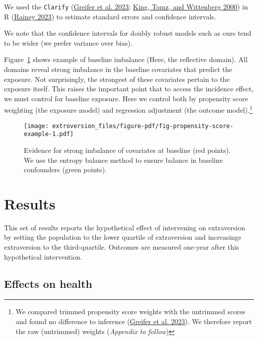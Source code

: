 \documentclass[
  singlecolumn]{report}
\begin{document}
We used the \texttt{Clarify}
(\protect\hyperlink{ref-greifer2023}{Greifer et al. 2023};
\protect\hyperlink{ref-king2000}{King, Tomz, and Wittenberg 2000}) in R
(\protect\hyperlink{ref-rainey2023}{Rainey 2023}) to estimate standard
errors and confidence intervals.

We note that the confidence intervals for doubly robust models such as
ours tend to be wider (we prefer variance over bias).

Figure~\ref{fig-propensity-score-example} shows example of baseline
imbalance (Here, the reflective domain). All domains reveal strong
imbalance in the baseline covariates that predict the exposure. Not
surprisingly, the strongest of these covariates pertain to the exposure
itself. This raises the important point that to access the incidence
effect, we must control for baseline exposure. Here we control both by
propensity score weighting (the exposure model) and regression
adjustment (the outcome model).\footnote{We compared trimmed propensity
  score weights with the untrimmed scores and found no difference to
  inference (\protect\hyperlink{ref-greifer2023}{Greifer et al. 2023}).
  We therefore report the raw (untrimmed) weights (\emph{Appendix to
  follow})}

\begin{figure}

{\centering \texttt{[image: extroversion\_files/figure-pdf/fig-propensity-score-example-1.pdf]}

}

\caption{\label{fig-propensity-score-example}Evidence for strong
imbalance of covariates at baseline (red points). We use the entropy
balance method to ensure balance in baseline confounders (green
points).}

\end{figure}

\hypertarget{results}{%
\section{Results}\label{results}}

This set of results reports the hypothetical effect of intervening on
extraversion by setting the population to the lower quartile of
extraversion and increasinge extraversion to the third-quartile.
Outcomes are measured one-year after this hypothetical intervention.

\hypertarget{effects-on-health}{%
\subsection{Effects on health}\label{effects-on-health}}
\end{document}
